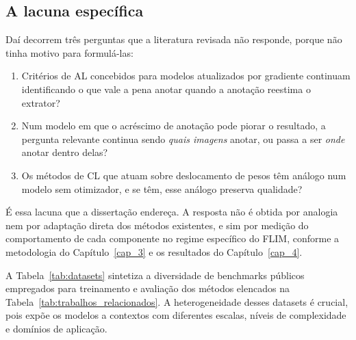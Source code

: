 \subsection{A lacuna específica}

Daí decorrem três perguntas que a literatura revisada não responde, porque não tinha motivo para formulá-las:

\begin{enumerate}
    \item Critérios de \ac{AL} concebidos para modelos atualizados por gradiente continuam identificando o que vale a pena anotar quando a anotação reestima o extrator?
    \item Num modelo em que o acréscimo de anotação pode piorar o resultado, a pergunta relevante continua sendo \emph{quais imagens} anotar, ou passa a ser \emph{onde} anotar dentro delas?
    \item Os métodos de \ac{CL} que atuam sobre deslocamento de pesos têm análogo num modelo sem otimizador, e se têm, esse análogo preserva qualidade?
\end{enumerate}

É essa lacuna que a dissertação endereça. A resposta não é obtida por analogia nem por adaptação direta dos métodos existentes, e sim por medição do comportamento de cada componente no regime específico do \ac{FLIM}, conforme a metodologia do Capítulo~\ref{cap_3} e os resultados do Capítulo~\ref{cap_4}.


A Tabela~\ref{tab:datasets} sintetiza a diversidade de benchmarks públicos empregados para treinamento e avaliação dos métodos elencados na Tabela~\ref{tab:trabalhos_relacionados}. A heterogeneidade desses datasets é crucial, pois expõe os modelos a contextos com diferentes escalas, níveis de complexidade e domínios de aplicação.



